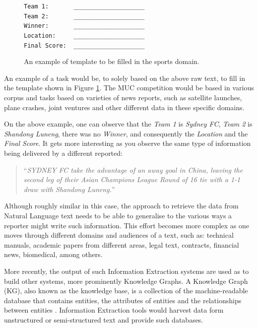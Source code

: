 \documentclass[11pt,a4paper,openright]{memoir}
\begin{document}
\begin{figure}[!htbp]
  \centering
  \RaggedRight
    \texttt{Team 1:\ \ \ \ \ \ \ \_\_\_\_\_\_\_\_\_\_\_\_\_\_\_\_\_\_\_\_} \\
    \texttt{Team 2:\ \ \ \ \ \ \ \_\_\_\_\_\_\_\_\_\_\_\_\_\_\_\_\_\_\_\_} \\
    \texttt{Winner:\ \ \ \ \ \ \ \_\_\_\_\_\_\_\_\_\_\_\_\_\_\_\_\_\_\_\_} \\
    \texttt{Location:\ \ \ \ \ \_\_\_\_\_\_\_\_\_\_\_\_\_\_\_\_\_\_\_\_} \\
    \texttt{Final Score:\ \ \_\_\_\_\_\_\_\_\_\_\_\_\_\_\_\_\_\_\_\_} \\
  \caption[An example of template to be filled in the sports domain.]{An example of template to be filled in the sports domain.}
  \label{fig:template_to_be_filled}
\end{figure}

An example of a task would be, to solely based on the above raw text, to fill in the template shown in Figure \ref{fig:template_to_be_filled}. The MUC competition would be based in various corpus and tasks based on varieties of news reports, such as satellite launches, plane crashes, joint ventures and other different data in these specific domains.

On the above example, one can observe that the \emph{Team 1} is \emph{Sydney FC}, \emph{Team 2} is \emph{Shandong Luneng}, there was no \emph{Winner}, and consequently the \emph{Location} and the \emph{Final Score}. It gets more interesting as you observe the same type of information being delivered by a different reported:

\blockquote{\enquote{\emph{SYDNEY FC take the advantage of an away goal in China, leaving the second leg of their Asian Champions League Round of 16 tie with a 1-1 draw with Shandong Luneng.}}}

Although roughly similar in this case, the approach to retrieve the data from Natural Language text needs to be able to generalise to the various ways a reporter might write such information. This effort becomes more complex as one moves through different domains and audiences of a text, such as: technical manuals, academic papers from different areas, legal text, contracts, financial news, biomedical, among others.

More recently, the output of such Information Extraction systems are used as to build other systems, more prominently Knowledge Graphs. A Knowledge Graph (KG), also known as the knowledge base, is a collection of the machine-readable database that contains entities, the attributes of entities and the relationships between entities \cite{google}. Information Extraction tools would harvest data form unstructured or semi-structured text and provide such databases.
\end{document}
